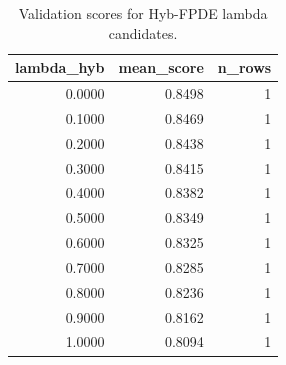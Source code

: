 \begin{table}[t]
\caption{Validation scores for Hyb-FPDE lambda candidates.}
\label{tab:lambda_distribution_computed}
\centering
\begin{tabular}{rrr}
\toprule
lambda\_hyb & mean\_score & n\_rows \\
\midrule
0.0000 & 0.8498 & 1 \\
0.1000 & 0.8469 & 1 \\
0.2000 & 0.8438 & 1 \\
0.3000 & 0.8415 & 1 \\
0.4000 & 0.8382 & 1 \\
0.5000 & 0.8349 & 1 \\
0.6000 & 0.8325 & 1 \\
0.7000 & 0.8285 & 1 \\
0.8000 & 0.8236 & 1 \\
0.9000 & 0.8162 & 1 \\
1.0000 & 0.8094 & 1 \\
\bottomrule
\end{tabular}

\end{table}
